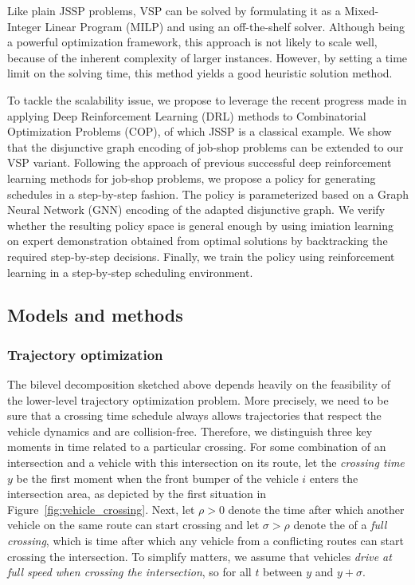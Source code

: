 \documentclass[notitlepage]{report}
\begin{document}
Like plain JSSP problems, VSP can be solved by formulating it as a Mixed-Integer
Linear Program (MILP) and using an off-the-shelf solver. Although being a
powerful optimization framework, this approach is not likely to scale well,
because of the inherent complexity of larger instances. However, by setting a
time limit on the solving time, this method yields a good heuristic solution
method.

To tackle the scalability issue, we propose to leverage the recent progress made
in applying Deep Reinforcement Learning (DRL) methods to Combinatorial
Optimization Problems (COP), of which JSSP is a classical example. We show that
the disjunctive graph encoding of job-shop problems can be extended to our VSP
variant. Following the approach of previous successful deep reinforcement
learning methods for job-shop problems, we propose a policy for generating
schedules in a step-by-step fashion. The policy is parameterized based on a
Graph Neural Network (GNN) encoding of the adapted disjunctive graph. We verify
whether the resulting policy space is general enough by using imiation learning
on expert demonstration obtained from optimal solutions by backtracking the
required step-by-step decisions. Finally, we train the policy using
reinforcement learning in a step-by-step scheduling environment.


\subsection*{Models and methods}


\subsubsection*{Trajectory optimization}

The bilevel decomposition sketched above depends heavily on the feasibility of
the lower-level trajectory optimization problem. More precisely, we need to be
sure that a crossing time schedule always allows trajectories that respect the
vehicle dynamics and are collision-free.
Therefore, we distinguish three key moments in time related to a particular
crossing. For some combination of an intersection and a vehicle with this
intersection on its route, let the \textit{crossing time} $y$ be the first
moment when the front bumper of the vehicle $i$ enters the intersection area, as
depicted by the first situation in Figure~\ref{fig:vehicle_crossing}. Next, let
$\rho > 0$ denote the time after which another vehicle on the same route can
start crossing and let $\sigma > \rho$ denote the of a \textit{full crossing},
which is time after which any vehicle from a conflicting routes can start
crossing the intersection.
To simplify matters, we assume that vehicles \textit{drive at full speed when
  crossing the intersection}, so for all $t$ between $y$ and
$y + \sigma$.
\end{document}
